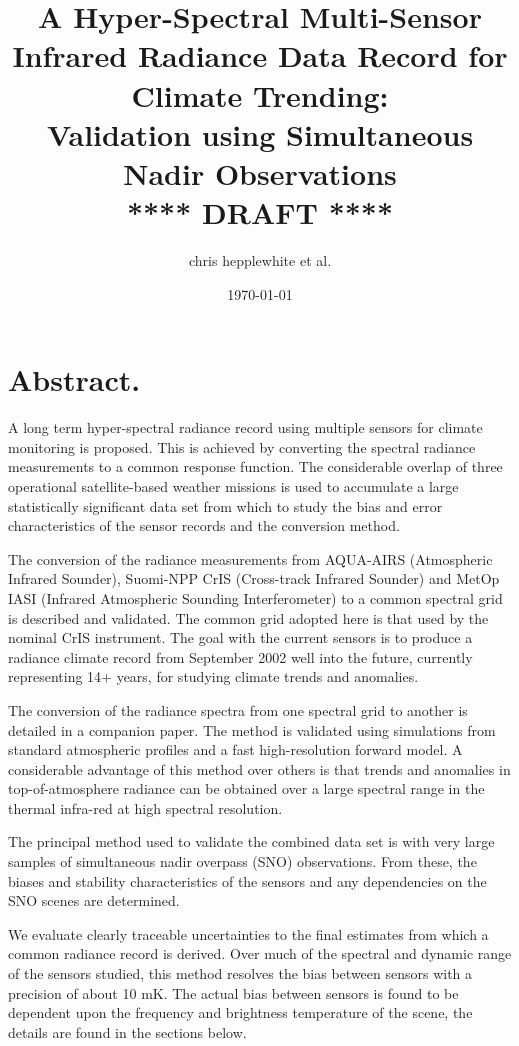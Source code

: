 \documentclass[twocolumn,10pt]{article}
\author{chris hepplewhite et al.}
\date{\today}
\title{A Hyper-Spectral Multi-Sensor Infrared Radiance Data Record for Climate Trending: \\  
  Validation using Simultaneous Nadir Observations \\  
  \vspace{3mm}
  {****} DRAFT {****}\\
}
\begin{document}
\maketitle


\section{Abstract.}
\label{sec:orgheadline1}

A long term hyper-spectral radiance record using multiple sensors for climate monitoring is proposed. This is achieved by converting the spectral radiance measurements to a common response function. The considerable overlap of three operational satellite-based weather missions is used to accumulate a large statistically significant data set from which to study the bias and error characteristics of the sensor records and the conversion method.

The conversion of the radiance measurements from AQUA-AIRS (Atmospheric Infrared Sounder), Suomi-NPP CrIS (Cross-track Infrared Sounder) and MetOp IASI (Infrared Atmospheric Sounding Interferometer) to a common spectral grid is described and validated. The common grid adopted here is that used by the nominal CrIS instrument. The goal with the current sensors is to produce a radiance climate record from September 2002 well into the future, currently representing 14+ years, for studying climate trends and anomalies.

The conversion of the radiance spectra from one spectral grid to another is detailed in a companion paper. The method is validated using simulations from standard atmospheric profiles and a fast high-resolution forward model. A considerable advantage of this method over others is that trends and anomalies in top-of-atmosphere radiance can be obtained over a large spectral range in the thermal infra-red at high spectral resolution.

The principal method used to validate the combined data set is with very large samples of simultaneous nadir overpass (SNO) observations. From these, the biases and stability characteristics of the sensors and any dependencies on the SNO scenes are determined.

We evaluate clearly traceable uncertainties to the final estimates from which a common radiance record is derived. Over much of the spectral and dynamic range of the sensors studied, this method resolves the bias between sensors with a precision of about 10 mK. The actual bias between sensors is found to be dependent upon the frequency and brightness temperature of the scene, the details are found in the sections below.
\end{document}
